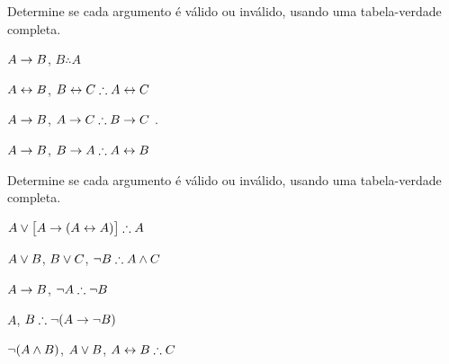 \noindent\problempart
\label{pr.TT.valid2}
Determine se cada argumento é válido ou inválido, usando uma tabela-verdade completa.
\begin{compactlist}
\item $A\rightarrow B$, $B \therefore  A$ \hfill {}

\item $A\leftrightarrow B$, $B\eiff C \therefore A\eiff C$ \hfill {}

\item $A \rightarrow B$, $A \eif C\therefore B \eif C$ \hfill {}.

\item $A \rightarrow B$, $B \eif A\therefore A \eiff B$ \hfill {} 
\end{compactlist}

\noindent\problempart
\label{pr.TT.valid3}
Determine se cada argumento é válido ou inválido, usando uma tabela-verdade completa.
\begin{compactlist}
\item $A\eor\bigl[A\eif(A\eiff A)\bigr] \therefore  A $\vspace{.5ex} \hfill {}
\item $A\vee B$, $B\vee C$, $\enot B \therefore A \eand C$\vspace{.5ex} \hfill {}
\item $A \rightarrow B$, $\enot A\therefore \enot B$ \vspace{.5ex} \hfill {}
\item $A$, $B\therefore \enot(A\eif \enot B)$ \vspace{.5ex} \hfill {}
\item $\neg(A \wedge B)$, $A \vee B$, $A \eiff B\therefore C$ \vspace{.5ex} \hfill {}
\end{compactlist}

